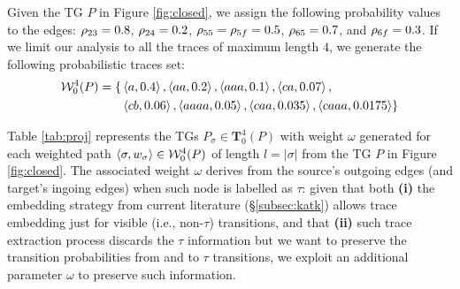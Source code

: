 \begin{example}\label{ex:neue}
Given the TG $P$ in Figure \ref{fig:closed}, we assign the following probability values to the edges: $\rho_{23}=0.8$, $\rho_{24}=0.2$, $\rho_{55}=\rho_{5f}=0.5$, $\rho_{65}=0.7$, and $\rho_{6f}=0.3$. If we limit our analysis to all the traces of maximum length $4$, we generate the following probabilistic traces set:
$$\begin{aligned}
\mathcal{W}^4_0(P)=\{&\braket{a,0.4},\braket{aa,0.2},\braket{aaa,0.1},\braket{ca,0.07},\\
&\braket{cb,0.06},\braket{aaaa,0.05},\braket{caa,0.035},\braket{caaa,0.0175}\}\\
\end{aligned}$$
\medskip

Table \ref{tab:proj} represents the TGs $P_\sigma\in\mathbf{T}_0^4(P)$ with weight $\omega$ generated for each weighted path $\braket{\sigma,w_\sigma}\in \mathcal{W}_0^4(P)$ of length $l=|\sigma|$ from the TG $P$ in Figure \ref{fig:closed}. The associated weight $\omega$ derives from the source's outgoing edges (and target's ingoing edges) when such node is labelled as $\tau$: given that both \textbf{(i)} the embedding strategy from current literature (\S\ref{subsec:katk}) allows trace embedding just for visible (i.e., non-$\tau$) transitions, and that \textbf{(ii)} such trace extraction process discards the $\tau$ information but we want to preserve the transition probabilities from and to $\tau$ transitions, we exploit an additional parameter $\omega$ to preserve such information.
\end{example}
	

